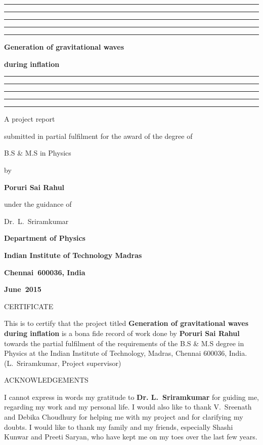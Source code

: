 \documentclass[12pt,a4paper,oneside]{book}
\begin{document}

\baselineskip 20pt




\thispagestyle{empty}
\topskip 15pt
\hrule\hrule\hrule\hrule\hrule
\vskip 20pt
\centerline{\Huge \bf Generation of gravitational waves} 
\vskip 15pt
\centerline{\Huge \bf during inflation} 
\vskip 20pt
\hrule\hrule\hrule\hrule\hrule
\vskip 30pt
\centerline{\Large A project report}
\vskip 8pt
\centerline{\Large submitted in partial fulfilment 
for the award of the degree of}
\vskip 8pt
\centerline{\Large B.S \& M.S in Physics}
\vskip 8pt
\centerline{\Large by}
\vskip 8pt
\centerline{\Large \bf Poruri Sai Rahul}
\vskip 8pt
\centerline{\Large under the guidance of}
\vskip 8pt
\centerline{\Large  Dr.~L.~Sriramkumar}
\vskip 30pt 
\begin{center}
\end{center}
\vskip 8pt 
\centerline{\Large \bf Department of Physics}
\vskip 8pt 
\centerline{\Large \bf Indian Institute of Technology Madras}
\vskip 8pt 
\centerline{\Large \bf Chennai~600036, India}
\vskip 8pt
\centerline{\Large \bf June~2015}

\newpage\topskip 40pt
\centerline{\Large CERTIFICATE}
\thispagestyle{empty}
\vskip 20pt\noindent 
This is to certify that the project titled {\bf Generation of gravitational waves during inflation} is a bona fide record of work done by 
{\bf Poruri Sai Rahul} towards the partial fulfilment of the requirements of the B.S \& M.S degree in Physics at the Indian 
Institute of Technology, Madras, Chennai 600036, India.
\vskip 120pt
\hspace{240pt}(L.~Sriramkumar, Project supervisor)


\newpage\topskip 40pt
\thispagestyle{empty}
\centerline{\Large ACKNOWLEDGEMENTS}
\vskip 20pt\noindent 

I cannot express in words my gratitude to {\bf Dr. L.~Sriramkumar} for guiding me, regarding my work and my personal life. 
I would also like to thank V.~Sreenath and Debika Choudhury for helping me with my project and for clarifying my doubts.
I would like to thank my family and my friends, especially Shashi Kunwar and Preeti Saryan, who have kept me on my toes 
over the last few years.
 
\end{document}
